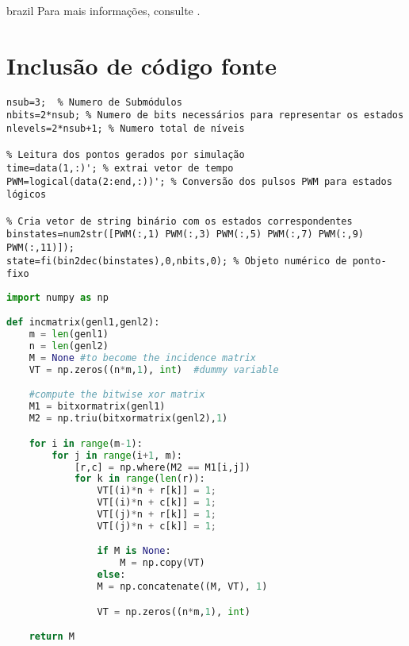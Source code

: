 \begin{otherlanguage*}{brazil}
Para mais informações, consulte \textcite[p. 47-52 e 135]{memoir}.

\section{Inclusão de código fonte}\label{sec-codeinsert}

\begin{lstlisting}[caption={Leitura dos dados simulados e conversão para estados topológicos.},label={lst:leituradadossim}]
% Pré definições iniciais
nsub=3;  % Numero de Submódulos
nbits=2*nsub; % Numero de bits necessários para representar os estados
nlevels=2*nsub+1; % Numero total de níveis

% Leitura dos pontos gerados por simulação
time=data(1,:)'; % extrai vetor de tempo
PWM=logical(data(2:end,:))'; % Conversão dos pulsos PWM para estados lógicos

% Cria vetor de string binário com os estados correspondentes
binstates=num2str([PWM(:,1) PWM(:,3) PWM(:,5) PWM(:,7) PWM(:,9) PWM(:,11)]);
state=fi(bin2dec(binstates),0,nbits,0); % Objeto numérico de ponto-fixo

\end{lstlisting}



\begin{lstlisting}[language=Python, caption=Python example]
import numpy as np

def incmatrix(genl1,genl2):
    m = len(genl1)
    n = len(genl2)
    M = None #to become the incidence matrix
    VT = np.zeros((n*m,1), int)  #dummy variable

    #compute the bitwise xor matrix
    M1 = bitxormatrix(genl1)
    M2 = np.triu(bitxormatrix(genl2),1)

    for i in range(m-1):
        for j in range(i+1, m):
            [r,c] = np.where(M2 == M1[i,j])
            for k in range(len(r)):
                VT[(i)*n + r[k]] = 1;
                VT[(i)*n + c[k]] = 1;
                VT[(j)*n + r[k]] = 1;
                VT[(j)*n + c[k]] = 1;

                if M is None:
                    M = np.copy(VT)
                else:
                M = np.concatenate((M, VT), 1)

                VT = np.zeros((n*m,1), int)

    return M
\end{lstlisting}





\end{otherlanguage*}
